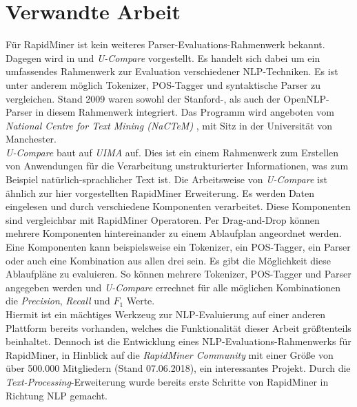 %
\chapter{Verwandte Arbeit}
\label{sec:related}

Für RapidMiner ist kein weiteres Parser-Evaluations-Rahmenwerk bekannt. Dagegen wird in \cite{ucompare1} und \cite{ucompare2} \textit{U-Compare} vorgestellt. Es handelt sich dabei um ein umfassendes Rahmenwerk zur Evaluation verschiedener NLP-Techniken. Es ist unter anderem möglich Tokenizer, POS-Tagger und syntaktische Parser zu vergleichen. Stand 2009 waren sowohl der Stanford-, als auch der OpenNLP-Parser in diesem Rahmenwerk integriert. Das Programm wird angeboten vom \textit{National Centre for Text Mining (NaCTeM)} \cite{nactem}, mit Sitz in der Universität von Manchester.\\
\textit{U-Compare} baut auf \textit{UIMA} \cite{uima} auf. Dies ist ein einem Rahmenwerk zum Erstellen von Anwendungen für die Verarbeitung unstrukturierter Informationen, was zum Beispiel natürlich-sprachlicher Text ist. Die Arbeitsweise von \textit{U-Compare} ist ähnlich zur hier vorgestellten RapidMiner Erweiterung. Es werden Daten eingelesen und durch verschiedene Komponenten verarbeitet. Diese Komponenten sind vergleichbar mit RapidMiner Operatoren. Per Drag-and-Drop können mehrere Komponenten hintereinander zu einem Ablaufplan angeordnet werden. Eine Komponenten kann beispielsweise ein Tokenizer, ein POS-Tagger, ein Parser oder auch eine Kombination aus allen drei sein. Es gibt die Möglichkeit diese Ablaufpläne zu evaluieren. So können mehrere Tokenizer, POS-Tagger und Parser angegeben werden und \textit{U-Compare} errechnet für alle möglichen Kombinationen die \textit{Precision}, \textit{Recall} und \(F_1\) Werte. \cite{ucompare2} \cite{ucompareeval} \\
Hiermit ist ein mächtiges Werkzeug zur NLP-Evaluierung auf einer anderen Plattform bereits vorhanden, welches die Funktionalität dieser Arbeit größtenteils beinhaltet. Dennoch ist die Entwicklung eines NLP-Evaluations-Rahmenwerks für RapidMiner, in Hinblick auf die \textit{RapidMiner Community} mit einer Größe von über 500.000 Mitgliedern (Stand 07.06.2018), ein interessantes Projekt. %
Durch die \textit{Text-Processing}-Erweiterung wurde bereits erste Schritte von RapidMiner in Richtung NLP gemacht.
